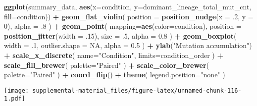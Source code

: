\documentclass[]{book}
\newenvironment{Shaded}{\begin{snugshade}}{\end{snugshade}}
\newcommand{\DataTypeTok}[1]{\textcolor[rgb]{0.13,0.29,0.53}{#1}}
\newcommand{\DecValTok}[1]{\textcolor[rgb]{0.00,0.00,0.81}{#1}}
\newcommand{\FloatTok}[1]{\textcolor[rgb]{0.00,0.00,0.81}{#1}}
\newcommand{\KeywordTok}[1]{\textcolor[rgb]{0.13,0.29,0.53}{\textbf{#1}}}
\newcommand{\NormalTok}[1]{#1}
\newcommand{\OperatorTok}[1]{\textcolor[rgb]{0.81,0.36,0.00}{\textbf{#1}}}
\newcommand{\OtherTok}[1]{\textcolor[rgb]{0.56,0.35,0.01}{#1}}
\newcommand{\StringTok}[1]{\textcolor[rgb]{0.31,0.60,0.02}{#1}}
\begin{document}
\begin{Shaded}
\begin{Highlighting}[]
\KeywordTok{ggplot}\NormalTok{(summary_data, }\KeywordTok{aes}\NormalTok{(}\DataTypeTok{x=}\NormalTok{condition, }\DataTypeTok{y=}\NormalTok{dominant_lineage_total_mut_cnt, }\DataTypeTok{fill=}\NormalTok{condition)) }\OperatorTok{+}
\StringTok{  }\KeywordTok{geom_flat_violin}\NormalTok{(}
    \DataTypeTok{position =} \KeywordTok{position_nudge}\NormalTok{(}\DataTypeTok{x =} \FloatTok{.2}\NormalTok{, }\DataTypeTok{y =} \DecValTok{0}\NormalTok{),}
    \DataTypeTok{alpha =} \FloatTok{.8}
\NormalTok{  ) }\OperatorTok{+}
\StringTok{  }\KeywordTok{geom_point}\NormalTok{(}
    \DataTypeTok{mapping=}\KeywordTok{aes}\NormalTok{(}\DataTypeTok{color=}\NormalTok{condition),}
    \DataTypeTok{position =} \KeywordTok{position_jitter}\NormalTok{(}\DataTypeTok{width =} \FloatTok{.15}\NormalTok{),}
    \DataTypeTok{size =} \FloatTok{.5}\NormalTok{,}
    \DataTypeTok{alpha =} \FloatTok{0.8}
\NormalTok{  ) }\OperatorTok{+}
\StringTok{  }\KeywordTok{geom_boxplot}\NormalTok{(}
    \DataTypeTok{width =} \FloatTok{.1}\NormalTok{,}
    \DataTypeTok{outlier.shape =} \OtherTok{NA}\NormalTok{,}
    \DataTypeTok{alpha =} \FloatTok{0.5}
\NormalTok{  ) }\OperatorTok{+}
\StringTok{  }\KeywordTok{ylab}\NormalTok{(}\StringTok{"Mutation accumulation"}\NormalTok{) }\OperatorTok{+}
\StringTok{  }\KeywordTok{scale_x_discrete}\NormalTok{(}
    \DataTypeTok{name=}\StringTok{"Condition"}\NormalTok{,}
    \DataTypeTok{limits=}\NormalTok{condition_order}
\NormalTok{  ) }\OperatorTok{+}
\StringTok{  }\KeywordTok{scale_fill_brewer}\NormalTok{(}
    \DataTypeTok{palette=}\StringTok{"Paired"}
\NormalTok{  ) }\OperatorTok{+}
\StringTok{  }\KeywordTok{scale_color_brewer}\NormalTok{(}
    \DataTypeTok{palette=}\StringTok{"Paired"}
\NormalTok{  ) }\OperatorTok{+}
\StringTok{  }\KeywordTok{coord_flip}\NormalTok{() }\OperatorTok{+}
\StringTok{  }\KeywordTok{theme}\NormalTok{(}
    \DataTypeTok{legend.position=}\StringTok{"none"}
\NormalTok{  )}
\end{Highlighting}
\end{Shaded}

\texttt{[image: supplemental-material\_files/figure-latex/unnamed-chunk-116-1.pdf]}

\begin{Shaded}
\end{Shaded}
\end{document}
